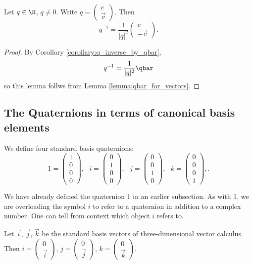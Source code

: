 \documentclass[oneside,12pt]{amsart}
\begin{document}
 \begin{lemma}
 \label{lemma:q_inverse_calc}
Let $q\in\H$, $q\not=0$.
Write $q=\begin{pmatrix}c\\ \vec{v}\end{pmatrix}$. Then
$$q^{-1} = \frac{1}{|q|^2}\begin{pmatrix}c\\ -\vec{v}\end{pmatrix}.$$
\end{lemma}
\begin{proof}
By Corollary \ref{corollary:q_inverse_by_qbar}, 
$$q^{-1} = \frac{1}{|q|^2}\qbar$$ so this lemma
follws from Lemma \ref{lemma:qbar_for_vectors}.
\end{proof}


\subsection{The Quaternions in terms of canonical basis elements}

We define four standard basis quaternions:
$$
1 = \begin{pmatrix}1\\0\\0\\0\end{pmatrix},\text{  }
i =  \begin{pmatrix}0\\1\\0\\0\end{pmatrix},\text{  }
j =  \begin{pmatrix}0\\0\\1\\0\end{pmatrix},\text{  }
k =  \begin{pmatrix}0\\0\\0\\1\end{pmatrix},\text{.}
$$

\begin{note}
We have already defined the quaternion 1 in an earlier subsection.
As with 1, we are overloading the symbol $i$ to refer to a quaternion in addition
to a complex number. One can tell from context which object $i$ refers to.
\end{note}

\begin{remark}
Let $\vec{i}$, $\vec{j}$, $\vec{k}$ be the standard basis vectors of three-dimensional vector calculus.
Then
$i = \begin{pmatrix}0\\\vec{i}\end{pmatrix}$, 
$j = \begin{pmatrix}0\\\vec{j}\end{pmatrix}$, 
$k = \begin{pmatrix}0\\\vec{k}\end{pmatrix}$.
\end{remark}
\end{document}
